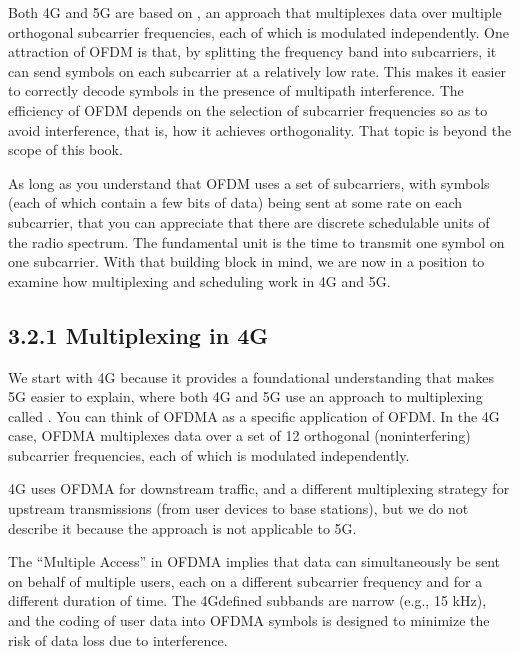 \documentclass[a4paper,11pt,english]{sphinxmanual}
\begin{document}
\sphinxAtStartPar
Both 4G and 5G are based on , an approach that multiplexes data over multiple
orthogonal subcarrier frequencies, each of which is modulated
independently. One attraction of OFDM is that, by splitting
the frequency band into subcarriers, it can send symbols on each
subcarrier at a relatively low rate. This makes it easier to correctly
decode symbols in the presence of multipath interference. The
efficiency of OFDM depends on the selection of
subcarrier frequencies so as to avoid interference, that is, how it
achieves orthogonality. That topic is beyond the scope of this book.

\sphinxAtStartPar
As long as you understand that OFDM uses a set of subcarriers, with
symbols (each of which contain a few bits of data) being sent at some
rate on each subcarrier, that you can appreciate that there are
discrete schedulable units of the radio spectrum. The fundamental unit
is the time to transmit one symbol on one subcarrier. With that
building block in mind, we are now in a position to examine how
multiplexing and scheduling work in 4G and 5G.


\subsection{3.2.1 Multiplexing in 4G}
\label{\detokenize{radio:multiplexing-in-4g}}
\sphinxAtStartPar
We start with 4G because it provides a foundational understanding that
makes 5G easier to explain, where both 4G and 5G use an approach to
multiplexing called . You can think of OFDMA as a specific application of OFDM. In
the 4G case, OFDMA multiplexes data over a set of 12 orthogonal
(non\sphinxhyphen{}interfering) subcarrier frequencies, each of which is modulated
independently.%
\begin{footnote}[1]\sphinxAtStartFootnote
4G uses OFDMA for downstream traffic, and a different
multiplexing strategy for upstream transmissions (from user
devices to base stations), but we do not describe it because
the approach is not applicable to 5G.
%
\end{footnote} The “Multiple Access” in OFDMA implies that data
can simultaneously be sent on behalf of multiple users, each on a
different subcarrier frequency and for a different duration of
time. The 4G\sphinxhyphen{}defined subbands are narrow (e.g., 15 kHz), and the
coding of user data into OFDMA symbols is designed to minimize the
risk of data loss due to interference.
\end{document}
